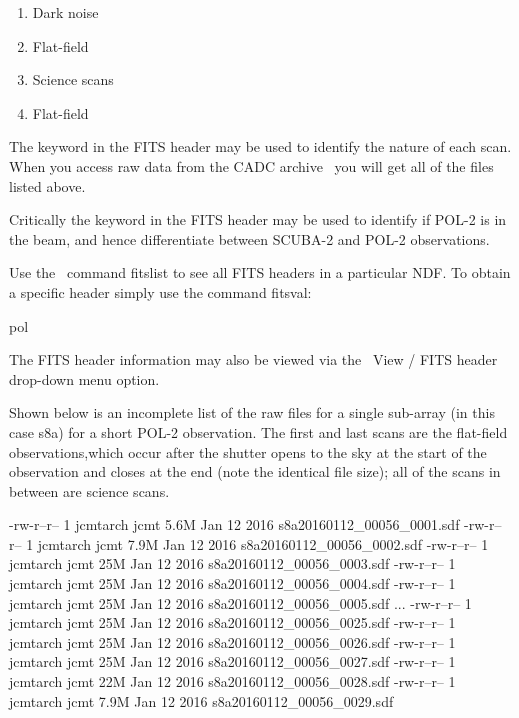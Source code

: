 \begin{enumerate}\itemsep-0.2em
\item Dark noise
\item Flat-field
\item Science scans
\item Flat-field
\end{enumerate}


The  keyword in the FITS header may be used to
identify the nature of each scan.  When you access raw data from the
CADC archive
\
you will get all of the files listed above.


Critically the  keyword in the FITS header may be used
to identify if POL-2 is in the beam, and hence differentiate between
SCUBA-2 and POL-2 observations.


\begin{tip}
  Use the \Kappa\ command fitslist to see all FITS headers in a
  particular NDF. To obtain a specific header simply use the command
  fitsval:
  \begin{terminalv}
pol
\end{terminalv}
The FITS header information may also be viewed via the \gaia\ View /
FITS header drop-down menu option.
\end{tip}

Shown below is an incomplete list of the raw files for a single
sub-array (in this case s8a) for a short POL-2 observation. The first
and last scans are the flat-field observations,which occur after the
shutter opens to the sky at the start of the observation and closes at
the end (note the identical file size); all of the scans in between
are science scans.


\begin{terminalv}
\end{terminalv}

\begin{terminalv}
-rw-r--r-- 1 jcmtarch jcmt 5.6M Jan 12  2016 s8a20160112_00056_0001.sdf
-rw-r--r-- 1 jcmtarch jcmt 7.9M Jan 12  2016 s8a20160112_00056_0002.sdf
-rw-r--r-- 1 jcmtarch jcmt  25M Jan 12  2016 s8a20160112_00056_0003.sdf
-rw-r--r-- 1 jcmtarch jcmt  25M Jan 12  2016 s8a20160112_00056_0004.sdf
-rw-r--r-- 1 jcmtarch jcmt  25M Jan 12  2016 s8a20160112_00056_0005.sdf
...
-rw-r--r-- 1 jcmtarch jcmt  25M Jan 12  2016 s8a20160112_00056_0025.sdf
-rw-r--r-- 1 jcmtarch jcmt  25M Jan 12  2016 s8a20160112_00056_0026.sdf
-rw-r--r-- 1 jcmtarch jcmt  25M Jan 12  2016 s8a20160112_00056_0027.sdf
-rw-r--r-- 1 jcmtarch jcmt  22M Jan 12  2016 s8a20160112_00056_0028.sdf
-rw-r--r-- 1 jcmtarch jcmt 7.9M Jan 12  2016 s8a20160112_00056_0029.sdf
\end{terminalv}

